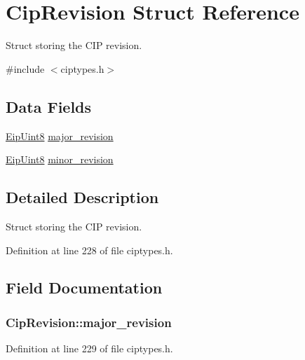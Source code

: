 \hypertarget{structCipRevision}{\section{\-Cip\-Revision \-Struct \-Reference}
\label{d0/d46/structCipRevision}
}


\-Struct storing the \-C\-I\-P revision.  




{\ttfamily \#include $<$ciptypes.\-h$>$}

\subsection*{\-Data \-Fields}
\begin{DoxyCompactItemize}
\item 
\hyperlink{typedefs_8h_aa0c108ee762a27720919a4634643040e}{\-Eip\-Uint8} \hyperlink{structCipRevision_af45bfc89ef4be631a0cf0a975bc596cc}{major\-\_\-revision}
\item 
\hyperlink{typedefs_8h_aa0c108ee762a27720919a4634643040e}{\-Eip\-Uint8} \hyperlink{structCipRevision_a5be82fd0db42cdb2c1d91127173b075f}{minor\-\_\-revision}
\end{DoxyCompactItemize}


\subsection{\-Detailed \-Description}
\-Struct storing the \-C\-I\-P revision. 

\-Definition at line 228 of file ciptypes.\-h.



\subsection{\-Field \-Documentation}
\hypertarget{structCipRevision_af45bfc89ef4be631a0cf0a975bc596cc}{
\subsubsection[{major\-\_\-revision}]{ {\bf \-Cip\-Revision\-::major\-\_\-revision}}}\label{d0/d46/structCipRevision_af45bfc89ef4be631a0cf0a975bc596cc}


\-Definition at line 229 of file ciptypes.\-h.



